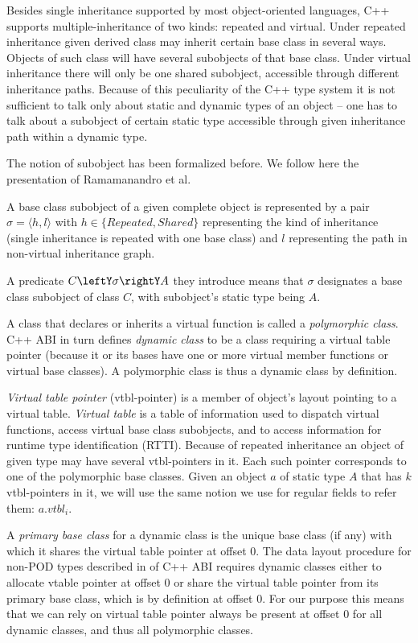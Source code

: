 \documentclass[preprint]{sigplanconf}
\begin{document}
Besides single inheritance supported by most object-oriented languages, C++ 
supports multiple-inheritance of two kinds: repeated and virtual. Under repeated 
inheritance given derived class may inherit certain base class in several ways. 
Objects of such class will have several subobjects of that base class. Under 
virtual inheritance there will only be one shared subobject, accessible through 
different inheritance paths. Because of this peculiarity of the C++ type system 
it is not sufficient to talk only about static and dynamic types of an object -- 
one has to talk about a subobject of certain static type accessible through 
given inheritance path within a dynamic type.

The notion of subobject has been formalized before\cite{RF95,WNST06,RDL11}.
We follow here the presentation of Ramamanandro et al\cite{RDL11}.

A base class subobject of a given complete object is represented by a pair 
$\sigma = \langle h,l\rangle$ with $h \in \{Repeated,Shared\}$ representing the 
kind of inheritance (single inheritance is repeated with one base class) and $l$ 
representing the path in non-virtual inheritance graph.

A predicate $C\leftY\sigma\rightY A$ they introduce means that $\sigma$ 
designates a base class subobject of class $C$, with subobject's static type 
being $A$.

A class that declares or inherits a virtual function is called a 
\emph{polymorphic class}\cite[]{C++0x}. C++ ABI in turn defines 
\emph{dynamic class} to be a class requiring a virtual table pointer (because it 
or its bases have one or more virtual member functions or virtual base classes). 
A polymorphic class is thus a dynamic class by definition.

\emph{Virtual table pointer} (vtbl-pointer) is a member of object's layout 
pointing to a virtual table. \emph{Virtual table} is a table of information used 
to dispatch virtual functions, access virtual base class subobjects, and to 
access information for runtime type identification (RTTI). Because of repeated
inheritance an object of given type may have several vtbl-pointers in it. Each 
such pointer corresponds to one of the polymorphic base classes. Given an object 
$a$ of static type $A$ that has $k$ vtbl-pointers in it, we will use the same 
notion we use for regular fields to refer them: $a.vtbl_i$.

A \emph{primary base class} for a dynamic class is the unique base class (if any) 
with which it shares the virtual table pointer at offset 0. The data layout 
procedure for non-POD types described in  of C++ ABI 
requires dynamic classes either to allocate vtable pointer at offset 0 or share 
the virtual table pointer from its primary base class, which is by definition at 
offset 0. For our purpose this means that we can rely on virtual table pointer 
always be present at offset 0 for all dynamic classes, and thus all polymorphic 
classes.
\end{document}
